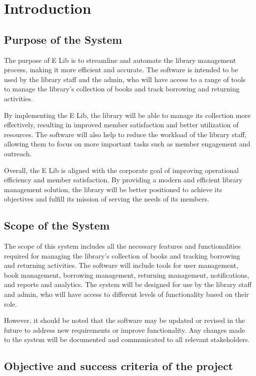 \chapter{Introduction}
\label{ch:introduction}

\section{Purpose of the System}
The purpose of  E Lib is to streamline and automate the library management process, making it more efficient and accurate. The software is intended to be used by the library staff and the admin, who will have access to a range of tools to manage the library's collection of books and track borrowing and returning activities.

By implementing the E Lib, the library will be able to manage its collection more effectively, resulting in improved member satisfaction and better utilization of resources. The software will also help to reduce the workload of the library staff, allowing them to focus on more important tasks such as member engagement and outreach.

Overall, the E Lib is aligned with the corporate goal of improving operational efficiency and member satisfaction. By providing a modern and efficient library management solution, the library will be better positioned to achieve its objectives and fulfill its mission of serving the needs of its members.




\section{Scope of the System}
The scope of this system includes all the necessary features and functionalities required for managing the library's collection of books and tracking borrowing and returning activities. The software will include tools for user management, book management, borrowing management, returning management, notifications, and reports and analytics. The system will be designed for use by the library staff and admin, who will have access to different levels of functionality based on their role. 

However, it should be noted that the software may be updated or revised in the future to address new requirements or improve functionality. Any changes made to the system will be documented and communicated to all relevant stakeholders.

\section{Objective and success criteria of the project}

